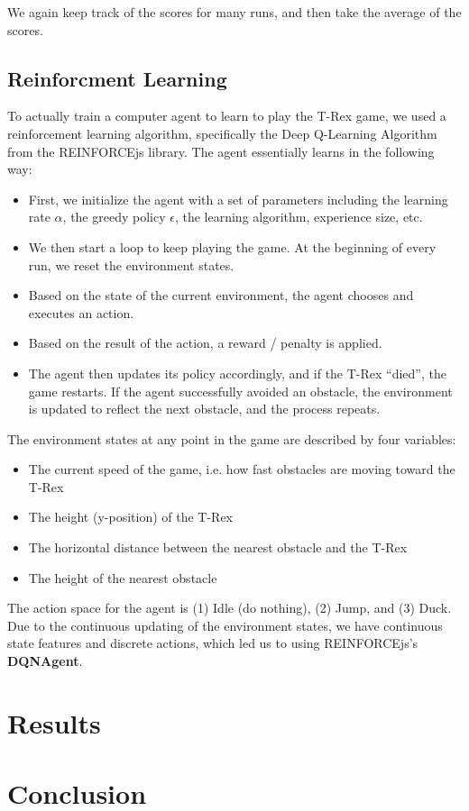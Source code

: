 \documentclass{scrartcl}
\begin{document}
    We again keep track of the scores for many runs, and then take the average of the scores.

    \subsection{Reinforcment Learning}
    To actually train a computer agent to learn to play the T-Rex game, we used a reinforcement learning algorithm, specifically the Deep Q-Learning Algorithm from the REINFORCEjs library. The agent essentially learns in the following way:

    \begin{itemize}
        \item First, we initialize the agent with a set of parameters including the learning rate $\alpha$, the greedy policy $\epsilon$, the learning algorithm, experience size, etc.
        \item We then start a loop to keep playing the game. At the beginning of every run, we reset the environment states.
        \item Based on the state of the current environment, the agent chooses and executes an action.
        \item Based on the result of the action, a reward / penalty is applied.
        \item The agent then updates its policy accordingly, and if the T-Rex ``died'', the game restarts. If the agent successfully avoided an obstacle, the environment is updated to reflect the next obstacle, and the process repeats.
    \end{itemize}

    The environment states at any point in the game are described by four variables:
    \begin{itemize}
        \item The current speed of the game, i.e. how fast obstacles are moving toward the T-Rex
        \item The height (y-position) of the T-Rex
        \item The horizontal distance between the nearest obstacle and the T-Rex
        \item The height of the nearest obstacle
    \end{itemize}

    The action space for the agent is (1) Idle (do nothing), (2) Jump, and (3) Duck. Due to the continuous updating of the environment states, we have continuous state features and discrete actions, which led us to using REINFORCEjs's \textbf{DQNAgent}.

\section{Results}

\section{Conclusion}



\end{document}
